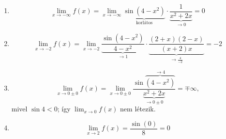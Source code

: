 \documentclass[11pt]{scrartcl}
\begin{document}
\begin{enumerate}
	\item \[
		      \lim_{x \to -\infty} f(x)
		      = \lim_{x \to -\infty}
		      \underbrace{\sin\left(4 - x^2\right)}_{\text{korlátos}} \cdot
		      \underbrace{\frac{1}{x^2 + 2x}}_{\to 0}
		      = 0
	      \]

	\item \[
		      \lim_{x \to -2} f(x)
		      = \lim_{x \to -2}
		      \underbrace{\frac{\sin\left(4 - x^2\right)}{4 - x^2}}_{\to 1} \cdot
		      \underbrace{\frac{(2 + x)(2 - x)}{(x + 2) x}}_{\to \frac{4}{-2}}
		      = -2
	      \]

	\item \[
		      \lim_{x \to 0 \pm 0} f(x)
		      = \lim_{x \to 0 \pm 0}
		      \frac{\sin \overbrace{\left(4 - x^2\right)}^{\to 4}}{\underbrace{x^2 + 2x}_{\to 0 \pm 0}}
		      = \mp \infty,
	      \]
	      mivel $\sin 4 < 0$; így $\lim_{x \to 0} f(x)$ nem létezik.

	\item \[
		      \lim_{x \to 2} f(x) = \frac{\sin(0)}{8} = 0
	      \]
\end{enumerate}
\end{document}
